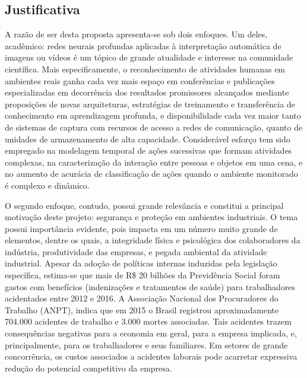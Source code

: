 
\subsection{Justificativa}
\label{ssec:just}
A razão de ser desta proposta apresenta-se sob dois enfoques. Um deles, acadêmico: redes neurais profundas aplicadas à interpretação automática de imagens ou vídeos é um tópico de grande atualidade e interesse na comunidade científica. Mais especificamente, o reconhecimento de atividades humanas em ambientes reais ganha cada vez mais espaço em conferências e publicações especializadas em decorrência dos resultados promissores alcançados mediante proposições de novas arquiteturas, estratégias de treinamento e transferência de conhecimento em aprendizagem profunda, e disponibilidade cada vez maior tanto de sistemas de captura com recursos de acesso a redes de comunicação, quanto de unidades de armazenamento de alta capacidade. Considerável esforço tem sido empregado na modelagem temporal de ações sucessivas que formam atividades complexas, na caracterização da interação entre pessoas e objetos em uma cena, e no aumento de acurácia de classificação de ações quando o ambiente monitorado é complexo e dinâmico.

O segundo enfoque, contudo, possui grande relevância e constitui a principal motivação deste projeto: segurança e proteção em ambientes industriais. O tema possui importância evidente, pois impacta em um número muito grande de elementos, dentre os quais, a integridade física e psicológica dos colaboradores da indústria, produtividade das empresas, e pegada ambiental da atividade industrial. Apesar da adoção de políticas internas induzidas pela legislação específica, estima-se que mais de R\$ 20 bilhões da Previdência Social foram gastos com benefícios (indenizações e tratamentos de saúde) para trabalhadores acidentados entre 2012 e 2016. A Associação Nacional dos Procuradores do Trabalho (ANPT), indica que em 2015 o Brasil registrou aproximadamente 704.000 acidentes de trabalho e 3.000 mortes associadas. Tais acidentes trazem consequências negativas para a economia em geral, para a empresa implicada, e, principalmente, para os trabalhadores e seus familiares. Em setores de grande concorrência, os custos associados a acidentes laborais pode acarretar expressiva redução do potencial competitivo da empresa.  

